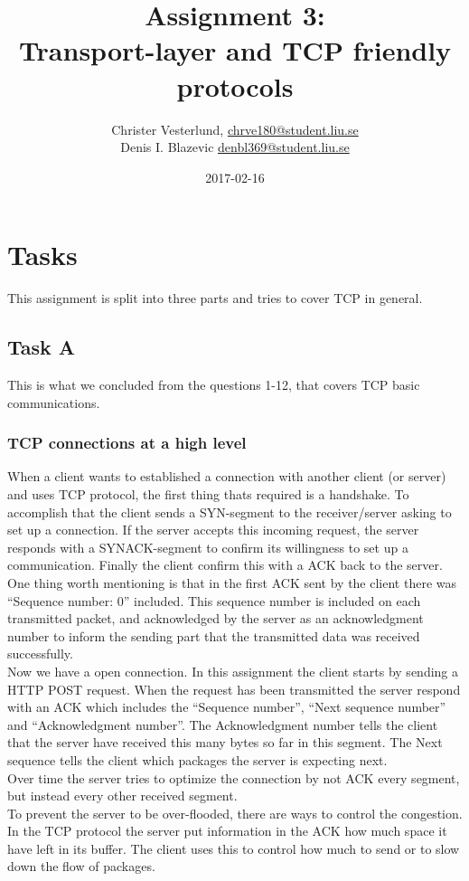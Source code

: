 \documentclass{mall}
\author{Christer Vesterlund, \url{chrve180@student.liu.se}\\
  Denis I. Blazevic \url{denbl369@student.liu.se}}
\title{Assignment 3:\\Transport-layer and TCP friendly protocols}
\date{2017-02-16}
\begin{document}
\projectpage
\tableofcontents
\newpage 

\section{Tasks} 
This assignment is split into three parts and tries to cover TCP in general.
\subsection{Task A}
This is what we concluded from the questions 1-12, that covers TCP basic communications. 
\subsubsection{TCP connections at a high level}
When a client wants to established a connection with another client (or server) and uses TCP protocol, the first thing thats required is a handshake. To accomplish that the client sends a SYN-segment to the receiver/server asking to set up a connection. If the server accepts this incoming request, the server responds with a SYNACK-segment to confirm its willingness to set up a communication. Finally the client confirm this with a ACK back to the server. One thing worth mentioning is that in the first ACK sent by the client there was ``Sequence number: 0'' included. This sequence number is included on each transmitted packet, and acknowledged by the server as an acknowledgment number to inform the sending part that the transmitted data was received successfully.\\

\setlength{\parindent}{0mm}
Now we have a open connection. In this assignment the client starts by sending a HTTP POST request. When the request has been transmitted the server respond with an ACK which includes the ``Sequence number'', ``Next sequence number'' and ``Acknowledgment number''. The Acknowledgment number tells the client that the server have received this many bytes so far in this segment. The Next sequence tells the client which packages the server is  expecting next.\\

Over time the server tries to optimize the connection by not ACK every segment, but instead every other received segment.\\

To prevent the server to be over-flooded, there are ways to control the congestion. In the TCP protocol the server put information in the ACK how much space it have left in its buffer. The client uses this to control how much to send or to slow down the flow of packages.
\end{document}
